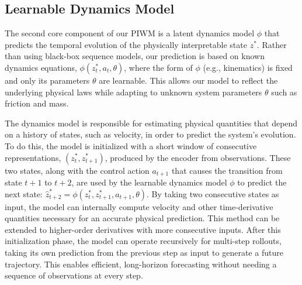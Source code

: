 \documentclass[nonacm,sigconf]{acmart}
\begin{document}


 
\subsection{Learnable Dynamics Model}


The second core component of our PIWM is a latent dynamics model \(\phi\) that predicts the temporal evolution of the physically interpretable state \(z^*\). Rather than using black-box sequence models, our prediction is based on known dynamics equations, \(\phi(z^*_t, a_t, \theta)\), where the form of \(\phi\) (e.g., kinematics) is fixed and only its parameters \(\theta\) are learnable. This allows our model to reflect the underlying physical laws while adapting to unknown system parameters $\theta$ such as friction and mass.

The dynamics model is responsible for estimating physical quantities that depend on a history of states, such as velocity, in order to predict the system's evolution. 
To do this, the model is initialized with a short window of consecutive representations, \( (z^*_t, z^*_{t+1}) \), produced by the encoder from observations. 
These two states, along with the control action \(a_{t+1}\) that causes the transition from state \(t+1\) to \(t+2\), are used by the learnable dynamics model \(\phi\) to predict the next state: \( \hat{z}^*_{t+2} = \phi(z^*_t, z^*_{t+1}, a_{t+1}, \theta) \). 
By taking two consecutive states as input, the model can internally compute velocity and other time-derivative quantities necessary for an accurate physical prediction. This method can be extended to higher-order derivatives with more consecutive inputs.
After this initialization phase, the model can operate recursively for multi-step rollouts, taking its own prediction from the previous step as input to generate a future trajectory. 
This enables efficient, long-horizon forecasting without needing a sequence of observations at every step.
\end{document}
